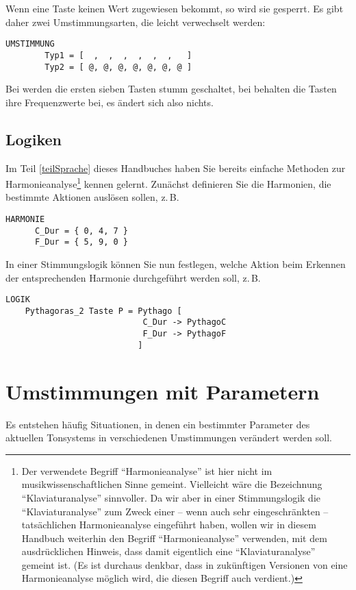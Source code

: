 Wenn eine Taste keinen Wert zugewiesen bekommt, so wird sie gesperrt.
Es gibt daher zwei Umstimmungsarten, die leicht verwechselt werden:

\begin{verbatim}
UMSTIMMUNG
	    Typ1 = [  ,  ,  ,  ,  ,  ,   ]
	    Typ2 = [ @, @, @, @, @, @, @ ]
\end{verbatim}

Bei  werden die ersten sieben Tasten stumm geschaltet, bei
 behalten die Tasten ihre Frequenzwerte bei, es ändert sich
also nichts.

\section{Logiken}\label{sec:logiken}

Im Teil \ref{teilSprache} dieses Handbuches haben Sie bereits einfache
Methoden zur Harmonieanalyse\footnote{Der verwendete Begriff
  "`Harmonieanalyse"' ist hier nicht im musikwissenschaftlichen Sinne
  gemeint. Vielleicht wäre die Bezeichnung "`Klaviaturanalyse"'
  sinnvoller. Da wir aber in einer Stimmungslogik die
  "`Klaviaturanalyse"' zum Zweck einer -- wenn auch sehr
  eingeschränkten -- tatsächlichen Harmonieanalyse eingeführt haben,
  wollen wir in diesem Handbuch weiterhin den Begriff
  "`Harmonieanalyse"' verwenden, mit dem ausdrücklichen Hinweis, dass
  damit eigentlich eine "`Klaviaturanalyse"' gemeint ist. (Es ist
  durchaus denkbar, dass in zukünftigen Versionen von \mutabor{} eine
  Harmonieanalyse möglich wird, die diesen Begriff auch verdient.)}
kennen gelernt. Zunächst definieren Sie die Harmonien, die bestimmte
Aktionen auslösen sollen, z.\,B.
\begin{verbatim}
HARMONIE
	  C_Dur = { 0, 4, 7 }
	  F_Dur = { 5, 9, 0 }
\end{verbatim}
In einer Stimmungslogik können Sie nun festlegen, welche Aktion beim
Erkennen der entsprechenden Harmonie durchgeführt werden soll, z.\,B.
\begin{verbatim}
LOGIK
    Pythagoras_2 Taste P = Pythago [
                            C_Dur -> PythagoC
                            F_Dur -> PythagoF
                           ]
\end{verbatim}



\chapter{Umstimmungen mit Parametern}\label{cha:umst-mit-param}
Es entstehen häufig Situationen, in denen ein bestimmter Parameter
des aktuellen Tonsystems in verschiedenen Umstimmungen verändert 
werden soll.

